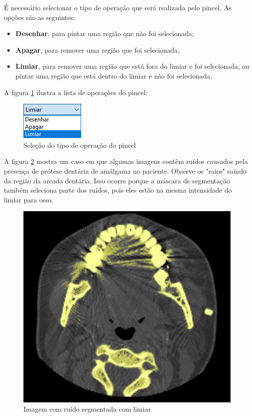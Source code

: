 É necessário selecionar o tipo de operação que será realizada pelo pincel. As opções são as
seguintes:

\begin{itemize}
	\item \textbf{Desenhar}, para pintar uma região que não foi selecionada;
	\item \textbf{Apagar}, para remover uma região que foi selecionada;
	\item \textbf{Limiar}, para remover uma região que está fora do limiar e foi selecionada, ou pintar
uma região que está dentro do limiar e não foi selecionada.
\end{itemize}

A figura \ref{fig:select_brush_operations} ilustra a lista de operações do pincel:

\begin{figure}[!htb]
\centering
\includegraphics[scale=0.7]{../user_guide_figures/invesalius_screen/segmentation_manual_pencil_type_operation_type_pt.png}
\caption{Seleção do tipo de operação do pincel}
\label{fig:select_brush_operations}
\end{figure}

A figura \ref{fig:noise_amalgaman} mostra um caso em que algumas imagens contêm ruídos
causados pela presença de prótese dentária de amálgama no paciente. Observe os "raios" 
saindo da região da arcada dentária. Isso ocorre porque a máscara de segmentação também
seleciona parte dos ruídos, pois eles estão na mesma intensidade do limiar para osso.

\begin{figure}[!htb]
\centering
\includegraphics[scale=0.3]{../user_guide_figures/invesalius_screen/segmentation_manual_noise_amalgam.jpg}
\caption{Imagem com ruído segmentada com limiar}
\label{fig:noise_amalgaman}
\end{figure}

